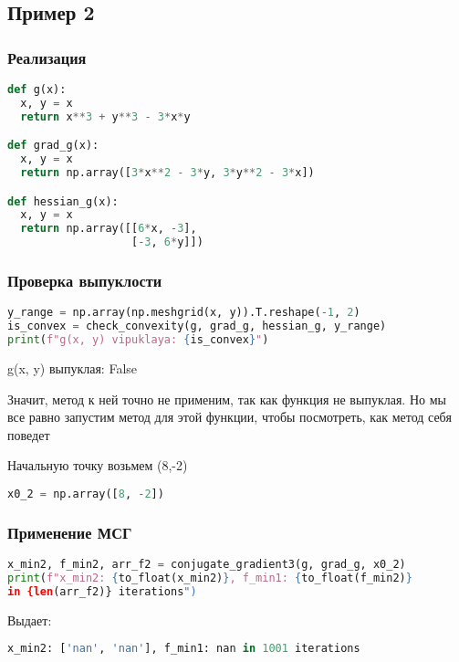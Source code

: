 \documentclass{article}
\begin{document}
\newpage
\subsection{Пример 2}

\subsubsection{Реализация}
\begin{lstlisting}[language=Python]
def g(x):
  x, y = x
  return x**3 + y**3 - 3*x*y

def grad_g(x):
  x, y = x
  return np.array([3*x**2 - 3*y, 3*y**2 - 3*x])

def hessian_g(x):
  x, y = x
  return np.array([[6*x, -3],
                   [-3, 6*y]])
\end{lstlisting}

\subsubsection{Проверка выпуклости}
\begin{lstlisting}[language=Python]
y_range = np.array(np.meshgrid(x, y)).T.reshape(-1, 2)
is_convex = check_convexity(g, grad_g, hessian_g, y_range)
print(f"g(x, y) vipuklaya: {is_convex}")
\end{lstlisting}

g(x, y) выпуклая: False

Значит, метод к ней точно не применим, так как функция не выпуклая. Но мы все равно запустим метод для этой функции, чтобы посмотреть, как метод себя поведет

Начальную точку возьмем (8,-2)

\begin{lstlisting}[language=Python]
x0_2 = np.array([8, -2])
\end{lstlisting}

\newpage
\subsubsection{Применение МСГ}
\begin{lstlisting}[language=Python]
x_min2, f_min2, arr_f2 = conjugate_gradient3(g, grad_g, x0_2)
print(f"x_min2: {to_float(x_min2)}, f_min1: {to_float(f_min2)}
in {len(arr_f2)} iterations")
\end{lstlisting}

Выдает:
\begin{lstlisting}[language=Python]
x_min2: ['nan', 'nan'], f_min1: nan in 1001 iterations
\end{lstlisting}
\end{document}
